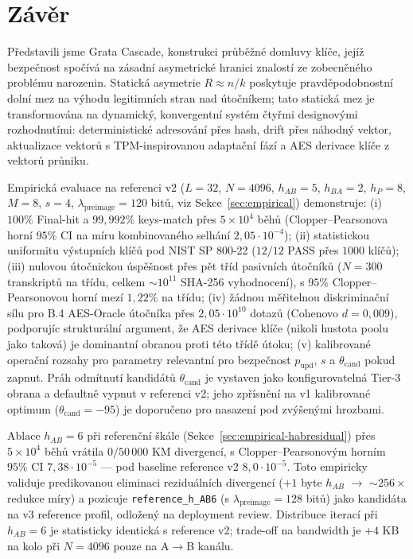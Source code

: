 \documentclass[11pt,a4paper]{article}
\begin{document}
\section{Závěr}\label{sec:conclusion}

Představili jsme Grata Cascade, konstrukci průběžné domluvy klíče, jejíž bezpečnost spočívá na zásadní asymetrické hranici znalostí ze zobecněného problému narozenin. Statická asymetrie $R \approx n/k$ poskytuje pravděpodobnostní dolní mez na výhodu legitimních stran nad útočníkem; tato statická mez je transformována na dynamický, konvergentní systém čtyřmi designovými rozhodnutími: deterministické adresování přes hash, drift přes náhodný vektor, aktualizace vektorů s TPM-inspirovanou adaptační fází a AES derivace klíče z vektorů průniku.

Empirická evaluace na referenci v2 ($L = 32$, $N = 4096$, $h_{AB} = 5$, $h_{BA} = 2$, $h_P = 8$, $M = 8$, $s = 4$, $\lambda_\text{preimage} = 120$ bitů, viz Sekce~\ref{sec:empirical}) demonstruje: (i) $100\%$ Final-hit a $99{,}992\%$ keys-match přes $5 \times 10^4$ běhů (Clopper--Pearsonova horní $95\%$ CI na míru kombinovaného selhání $2{,}05 \cdot 10^{-4}$); (ii) statistickou uniformitu výstupních klíčů pod NIST SP 800-22 ($12/12$ PASS přes $1000$ klíčů); (iii) nulovou útočnickou úspěšnost přes pět tříd pasivních útočníků ($N = 300$ transkriptů na třídu, celkem $\sim 10^{11}$ SHA-256 vyhodnocení), s $95\%$ Clopper--Pearsonovou horní mezí $1{,}22\%$ na třídu; (iv) žádnou měřitelnou diskriminační sílu pro B.4 AES-Oracle útočníka přes $2{,}05 \cdot 10^{10}$ dotazů (Cohenovo $d = 0{,}009$), podporujíc strukturální argument, že AES derivace klíče (nikoli hustota poolu jako taková) je dominantní obranou proti této třídě útoku; (v) kalibrované operační rozsahy pro parametry relevantní pro bezpečnost $p_\text{upd}$, $s$ a $\theta_\text{cand}$ pokud zapnut. Práh odmítnutí kandidátů $\theta_\text{cand}$ je vystaven jako konfigurovatelná Tier-3 obrana a defaultně vypnut v referenci v2; jeho zpřísnění na v1 kalibrované optimum ($\theta_\text{cand} = -95$) je doporučeno pro nasazení pod zvýšenými hrozbami.

Ablace $h_{AB} = 6$ při referenční škále (Sekce~\ref{sec:empirical-habresidual}) přes $5 \times 10^4$ běhů vrátila $0/50\,000$ KM divergencí, s Clopper--Pearsonovým horním $95\%$ CI $7{,}38 \cdot 10^{-5}$ — pod baseline reference v2 $8{,}0 \cdot 10^{-5}$. Toto empiricky validuje predikovanou eliminaci reziduálních divergencí ($+1$ byte $h_{AB}$ $\to$ $\sim 256\times$ redukce míry) a pozicuje \texttt{reference\_h\_AB6} (s $\lambda_\text{preimage} = 128$ bitů) jako kandidáta na v3 reference profil, odložený na deployment review. Distribuce iterací při $h_{AB} = 6$ je statisticky identická s reference v2; trade-off na bandwidth je $+4$ KB na kolo při $N = 4096$ pouze na A$\to$B kanálu.
\end{document}
